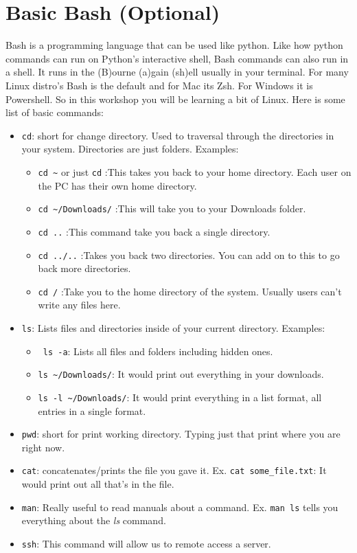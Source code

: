 \documentclass[12pt, a4paper]{article}
\begin{document}
\section{Basic Bash (Optional)}
Bash is a programming language that can be used like python. Like how python commands can run on Python's interactive shell, Bash commands can also run in a shell. It runs in the (B)ourne (a)gain (sh)ell usually in your terminal. For many Linux distro's Bash is the default and for Mac its Zsh. For Windows it is Powershell. So in this workshop you will be learning a bit of Linux. Here is some list of basic commands:


\begin{itemize}
    \item \verb`cd`: short for change directory. Used to traversal through the directories in your system. Directories are just folders. Examples:
        \begin{itemize}
            \item \verb`cd ~` or just \verb`cd` :This takes you back to your home directory. Each user on the PC has their own home directory.
            \item \verb`cd ~/Downloads/` :This will take you to your Downloads folder.
            \item \verb`cd ..` :This command take you back a single directory.
            \item \verb`cd ../..` :Takes you back two directories. You can add on to this to go back more directories.
            \item \verb`cd /`  :Take you to the home directory of the system. Usually users can't write any files here.
        \end{itemize}
    \item \verb`ls`: Lists files and directories inside of your current directory. Examples:
        \begin{itemize}
            \item \verb` ls -a`: Lists all files and folders including hidden ones.
            \item \verb`ls ~/Downloads/`: It would print out everything in your downloads.
            \item \verb`ls -l ~/Downloads/`: It would print everything in a list format, all entries in a single format.
        \end{itemize}
    \item \verb`pwd`: short for print working directory. Typing just that print where you are right now.
    \item \verb`cat`: concatenates/prints the file you gave it. Ex. \verb`cat some_file.txt`: It would print out all that's in the file.
    \item \verb`man`: Really useful to read manuals about a command. Ex. \verb`man ls` tells you everything about the \textit{ls} command.
    \item \verb`ssh`: This command will allow us to remote access a server.
\end{itemize}
\end{document}
